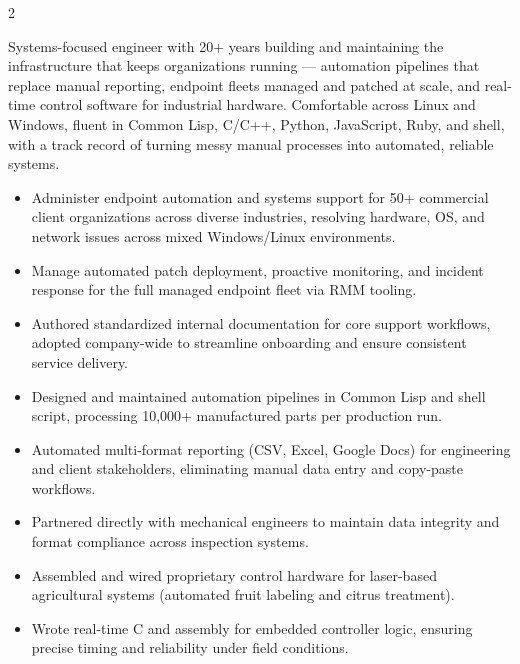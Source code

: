 \documentclass[10pt,letterpaper,ragged2e,withhyper]{altacv}
\begin{document}
\begin{paracol}{2}


Systems-focused engineer with 20+ years building and maintaining the infrastructure that keeps organizations running — automation pipelines that replace manual reporting, endpoint fleets managed and patched at scale, and real-time control software for industrial hardware. Comfortable across Linux and Windows, fluent in Common Lisp, C/C++, Python, JavaScript, Ruby, and shell, with a track record of turning messy manual processes into automated, reliable systems.


\begin{itemize}
  \item Administer endpoint automation and systems support for 50+ commercial client organizations across diverse industries, resolving hardware, OS, and network issues across mixed Windows/Linux environments.
  \item Manage automated patch deployment, proactive monitoring, and incident response for the full managed endpoint fleet via RMM tooling.
  \item Authored standardized internal documentation for core support workflows, adopted company-wide to streamline onboarding and ensure consistent service delivery.
\end{itemize}

\begin{itemize}
  \item Designed and maintained automation pipelines in Common Lisp and shell script, processing 10,000+ manufactured parts per production run.
  \item Automated multi-format reporting (CSV, Excel, Google Docs) for engineering and client stakeholders, eliminating manual data entry and copy-paste workflows.
  \item Partnered directly with mechanical engineers to maintain data integrity and format compliance across inspection systems.
\end{itemize}

\begin{itemize}
  \item Assembled and wired proprietary control hardware for laser-based agricultural systems (automated fruit labeling and citrus treatment).
  \item Wrote real-time C and assembly for embedded controller logic, ensuring precise timing and reliability under field conditions.
\end{itemize}


\end{paracol}
\end{document}
